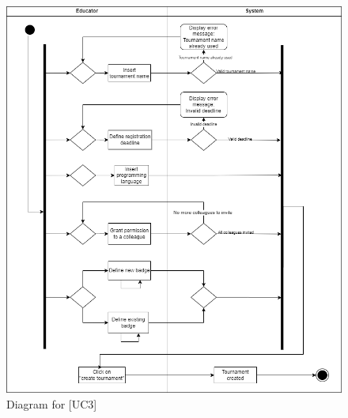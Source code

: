 \documentclass[12pt,oneside,a4paper]{article}
\begin{document}
\begin{figure}[htbp]
    \centering
    \includegraphics[width=1\linewidth]{Images/Diagrams/EducatorCreatesTournament.png}
    \caption{Diagram for [UC3]}
    \label{fig:enter-label}
\end{figure}

\pagebreak
\end{document}
